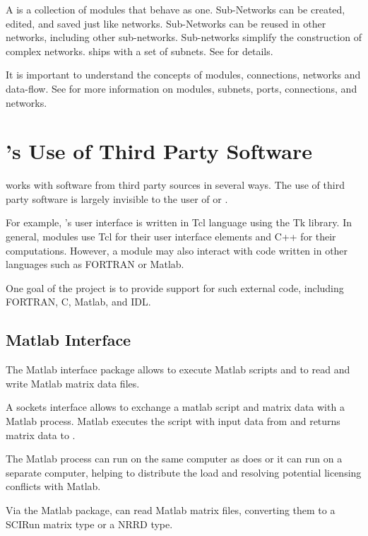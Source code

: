 A  is a collection of modules that behave as one.
Sub-Networks can be created, edited, and saved just like networks.
Sub-Networks can be reused in other networks, including other
sub-networks.  Sub-networks simplify the construction of complex
networks.  \sr{} ships with a  set of subnets.  See  for details.

It is important to understand the concepts of modules, connections,
networks and data-flow.  See  for more information on modules, subnets,
ports, connections, and networks.

\section{\sr{}'s Use of Third Party Software}
\label{sec:con-links} 

\SR{} works with software from third party sources in several ways.
The use of third party software is largely invisible to the user of
\SR{} or \BIOPSE{}.

For example, \sr{}'s user interface is written in Tcl language
using the Tk library.  In general, \sr{} modules use Tcl for their
user interface elements and C++ for their computations.  However, a
module may also interact with code written in other languages such as
FORTRAN or Matlab.

One goal of the \BIOPSE{} project is to provide
support for such external code, including FORTRAN, C, Matlab, and
IDL\@.

\subsection{Matlab Interface}
\label{sec:concept-matlab} 

The Matlab interface package allows \sr{} to execute Matlab scripts
and to read and write Matlab matrix data files.

A sockets interface allows \sr{} to exchange a matlab script and matrix
data with a Matlab process.  Matlab executes the script with input
data from \sr{} and returns matrix data to \sr{}.  

The Matlab process can run on the same computer as does \sr{} or it
can run on a separate computer, helping to distribute the load and
resolving potential licensing conflicts with Matlab.

Via the Matlab package, \sr{} can read Matlab matrix files, converting
them to a SCIRun matrix type or a NRRD type.

